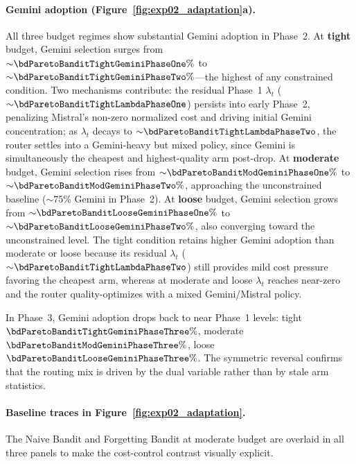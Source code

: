 \paragraph{Gemini adoption (Figure~\ref{fig:exp02_adaptation}a).}
All three budget regimes show substantial Gemini adoption in Phase~2.
At \textbf{tight} budget, Gemini selection surges from
${\sim}\bdParetoBanditTightGeminiPhaseOne\%$ to
${\sim}\bdParetoBanditTightGeminiPhaseTwo\%$---the highest of any
constrained condition.
Two mechanisms contribute: the residual Phase~1 $\lambda_t$
(${\sim}\bdParetoBanditTightLambdaPhaseOne$) persists into early
Phase~2, penalizing Mistral's non-zero normalized cost and driving
initial Gemini concentration; as $\lambda_t$ decays to
${\sim}\bdParetoBanditTightLambdaPhaseTwo$, the router settles into
a Gemini-heavy but mixed policy, since Gemini is simultaneously
the cheapest and highest-quality arm post-drop.
At \textbf{moderate} budget, Gemini selection rises from
${\sim}\bdParetoBanditModGeminiPhaseOne\%$ to
${\sim}\bdParetoBanditModGeminiPhaseTwo\%$, approaching the
unconstrained baseline (${\sim}75\%$ Gemini in Phase~2).
At \textbf{loose} budget, Gemini selection grows from
${\sim}\bdParetoBanditLooseGeminiPhaseOne\%$ to
${\sim}\bdParetoBanditLooseGeminiPhaseTwo\%$, also converging
toward the unconstrained level.
The tight condition retains higher Gemini adoption than moderate or
loose because its residual $\lambda_t$
(${\sim}\bdParetoBanditTightLambdaPhaseTwo$) still provides mild
cost pressure favoring the cheapest arm, whereas at moderate and
loose $\lambda_t$ reaches near-zero and the router quality-optimizes
with a mixed Gemini/Mistral policy.

In Phase~3, Gemini adoption drops back to near Phase~1 levels:
tight $\bdParetoBanditTightGeminiPhaseThree\%$, moderate
$\bdParetoBanditModGeminiPhaseThree\%$, loose
$\bdParetoBanditLooseGeminiPhaseThree\%$.
The symmetric reversal confirms that the routing mix is driven by
the dual variable rather than by stale arm statistics.

\paragraph{Baseline traces in Figure~\ref{fig:exp02_adaptation}.}
The Naive Bandit and Forgetting Bandit at moderate budget are
overlaid in all three panels to make the cost-control contrast
visually explicit.


